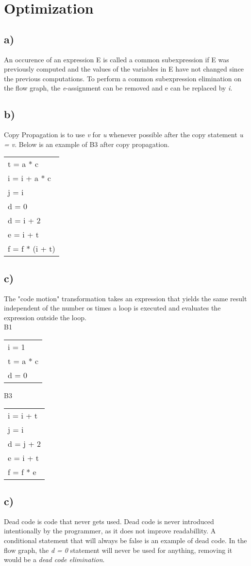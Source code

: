 \section{Optimization}
\subsection*{a)}
An occurence of an expression E is called a common subexpression if E was previously computed and  the values of the variables in E have not changed since the previous computations. To perform a common subexpression elimination on the flow graph, the \emph{e}-assignment can be removed and {e} can be replaced by \emph{i}. \\
\subsection*{b)}
Copy Propagation is to use \emph{v} for \emph{u} whenever possible after the copy statement \emph{u = v}. Below is an example of B3 after copy propagation.\\
\begin{tabular}{|l|}
\hline
t = a * c	\\
i = i + a * c	\\
j = i		\\
d = 0		\\
d = i + 2	\\
e = i + t	\\
f = f * (i + t) \\
\hline
\end{tabular}

\subsection*{c)}
The "code motion" transformation takes an expression that yields the same result independent of the number os times a loop is executed and evaluates the expression outside the loop.\\
B1
\begin{tabular}{|l|}
\hline
i = 1		\\
t = a * c	\\
d = 0		\\
\hline
\end{tabular}
B3
\begin{tabular}{|l|}
\hline
i = i + t	\\
j = i		\\
d = j + 2	\\
e = i + t	\\
f = f * e	\\
\hline
\end{tabular}

\subsection*{c)}
Dead code is code that never gets used. Dead code is never introduced intentionally by the programmer, as it does not improve readabillity. A conditional statement that will always be false is an example of dead code. In the flow graph, the \emph{d = 0} statement will never be used for anything, removing it would be a \emph{dead code elimination}.

